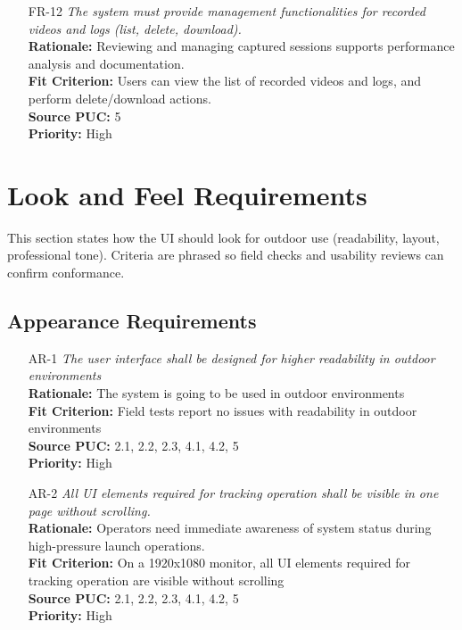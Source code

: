 \documentclass[12pt]{article}
\begin{document}
\begin{itemize}[leftmargin=*]
  \item[FR-12] \emph{The system must provide management functionalities for recorded
          videos and logs (list, delete, download).}\\[2mm]
        \textbf{Rationale:} Reviewing and managing captured sessions supports performance analysis and documentation.\\
        \textbf{Fit Criterion:} Users can view the list of recorded videos and logs, and perform delete/download actions.\\
        \textbf{Source PUC:} 5 \\
        \textbf{Priority:} High

\end{itemize}
\section{Look and Feel Requirements}
This section states how the UI should look for outdoor use (readability, layout, professional tone).
Criteria are phrased so field checks and usability reviews can confirm conformance.
\subsection{Appearance Requirements}
\begin{itemize}[leftmargin=*]
  \item[AR-1] \emph{The user interface shall be designed for higher readability in
          outdoor environments}\\[2mm]
        \textbf{Rationale:} The system is going to be used in outdoor environments\\
        \textbf{Fit Criterion:} Field tests report no issues with readability in outdoor environments\\
        \textbf{Source PUC:} 2.1, 2.2, 2.3, 4.1, 4.2, 5 \\
        \textbf{Priority:} High

  \item[AR-2] \emph{All UI elements required for tracking operation shall be visible in
          one page without scrolling.}\\[2mm]
        \textbf{Rationale:} Operators need immediate awareness of system
        status during high-pressure launch operations.\\
        \textbf{Fit Criterion:} On a 1920x1080 monitor, all UI elements required for tracking operation are visible without scrolling\\
        \textbf{Source PUC:} 2.1, 2.2, 2.3, 4.1, 4.2, 5 \\
        \textbf{Priority:} High
\end{itemize}
\end{document}
